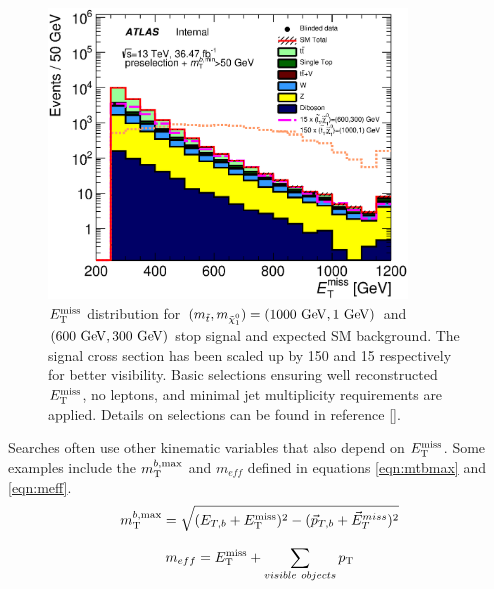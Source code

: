 \begin{figure}[h!]
\centering
    \includegraphics[width=0.85\textwidth]{figures/preselection/Met_preCutSRPlot_withRatio_log.eps}\hspace{0.05\textwidth}
\caption[Stop signal with $m_{\stop}-m_{\ninoone} >> m_t$ and SM background $\met$ distribution after loose preliminary selections for $\met>250 \gev$, zero leptons and at least four jets]{ $\met$ distribution for $(m_{\stop}, m_{\ninoone}) = (1000 \gev,1 \gev)$ and $(600 \gev, 300 \gev)$ stop signal and expected SM background.  The signal cross section has been scaled up by 150 and 15 respectively for better visibility.  Basic selections ensuring well reconstructed $\met$, no leptons, and minimal jet multiplicity requirements are applied.  Details on selections can be found in reference [\cite{stop0LCONF}]. }
\label{fig:presel:MET1}
\end{figure}

\indent Searches often use other kinematic variables that also depend on $\met$.  Some examples include the $m_{\mathrm{T}}^{b,\mathrm{max}}$ and $m_{eff}$ defined in equations \ref{eqn:mtbmax} and \ref{eqn:meff}. \\

\begin{equation}
m_{\mathrm{T}}^{b,\mathrm{max}} = \sqrt{  (E_{T,b} +E_{\mathrm{T}}^{\mathrm{miss}} )^2 - ( \vec{p}_{T,b} + \vec{E}_{T}^{miss} )^2 }
\label{eqn:mtbmax}
\end{equation}

\begin{equation}
m_{eff} =  E_{\mathrm{T}}^{\mathrm{miss}} + \sum_{visible~objects} p_{\mathrm{T}} 
\label{eqn:meff}
\end{equation}

